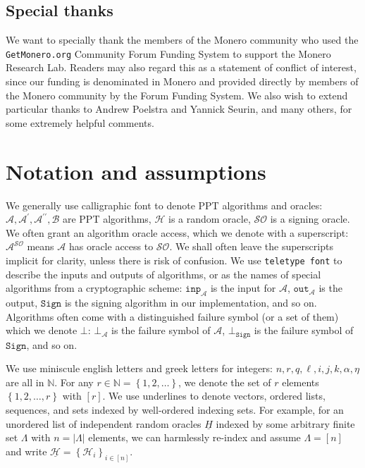\documentclass{iacrtrans}
\theoremstyle{definition}
\numberwithin{theorem}{subsection}
\numberwithin{lemma}{theorem}
\newcommand{\adversary}{\mathcal{A}}
\newcommand{\bbn}{\mathbb{N}}
\begin{document}
\subsection{Special thanks} 

We want to specially thank the members of the Monero community who used the \texttt{GetMonero.org} Community Forum Funding System to support the Monero Research Lab. Readers may also regard this as a statement of conflict of interest, since our funding is denominated in Monero and provided directly by members of the Monero community by the Forum Funding System. We also wish to extend particular thanks to Andrew Poelstra and Yannick Seurin, and many others, for some extremely helpful comments.


\section{Notation and assumptions}\label{notation}

We generally use calligraphic font to denote PPT algorithms and oracles: $\adversary, \adversary^\prime, \adversary^{\prime \prime}, \mathcal{B}$ are PPT algorithms, $\mathcal{H}$ is a random oracle, $\mathcal{SO}$ is a signing oracle. We often grant an algorithm oracle access, which we denote with a superscript: $\mathcal{A}^{\mathcal{SO}}$ means $\mathcal{A}$ has oracle access to $\mathcal{SO}$. We shall often leave the superscripts implicit for clarity, unless there is risk of confusion. We use \texttt{teletype font} to describe the inputs and outputs of algorithms, or as the names of special algorithms from a cryptographic scheme: $\texttt{inp}_\adversary$ is the input for $\adversary$, $\texttt{out}_\adversary$ is the output, $\texttt{Sign}$ is the signing algorithm in our implementation, and so on. Algorithms often come with a distinguished failure symbol (or a set of them) which we denote $\bot$: $\bot_\adversary$ is the failure symbol of $\adversary$, $\bot_{\texttt{Sign}}$ is the failure symbol of $\texttt{Sign}$, and so on.

We use miniscule english letters and greek letters for integers: $n, r, q, \ell, i, j, k, \alpha, \eta$ are all in $\bbn$. For any $r \in \bbn = \left\{1, 2, \ldots\right\}$, we denote the set of $r$ elements $\left\{1, 2, \ldots, r\right\}$ with $\left[r\right]$. We use underlines to denote vectors, ordered lists, sequences, and sets indexed by well-ordered indexing sets. For example, for an unordered list of independent random oracles $\underline{H}$ indexed by some arbitrary finite set $\Lambda$ with $n = \left|\Lambda\right|$ elements, we can harmlessly re-index and assume $\Lambda = [n]$ and write $\underline{\mathcal{H}} = \left\{\mathcal{H}_i\right\}_{i \in [n]}$. 
\end{document}

